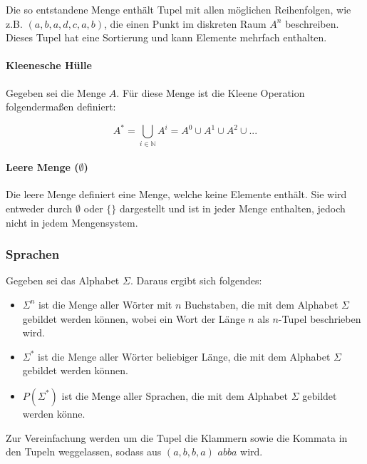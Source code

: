 \documentclass[../main.tex]{subfiles}
\begin{document}
                    Die so entstandene Menge enthält Tupel mit allen möglichen Reihenfolgen, wie z.B. $\left(a, b, a, d, c, a, b\right)$, die einen Punkt im diskreten Raum $A^n$ beschreiben. Dieses Tupel hat eine Sortierung und kann Elemente mehrfach enthalten.
                    
                \paragraph{Kleenesche Hülle}
                    Gegeben sei die Menge $A$. Für diese Menge ist die Kleene Operation folgendermaßen definiert:
                    
                    \begin{equation}
                        A^* = \bigcup_{i \in \mathbb{N} } A^i=A^0\cup A^1\cup A^2\cup ...
                    \end{equation}
                    
    	\paragraph{Leere Menge ($\emptyset$)}
    	    Die leere Menge definiert eine Menge, welche keine Elemente enthält. Sie wird entweder durch $\emptyset$ oder $\{\}$ dargestellt und ist in jeder Menge enthalten, jedoch nicht in jedem Mengensystem.
                
            \subsubsection{Sprachen}
                Gegeben sei das Alphabet $\Sigma$. Daraus ergibt sich folgendes:
                
                \begin{itemize}
                    \item $\Sigma^n$ ist die Menge aller Wörter mit $n$ Buchstaben, die mit dem Alphabet $\Sigma$ gebildet werden können, wobei ein Wort der Länge $n$ als $n$-Tupel beschrieben wird.
                    \item $\Sigma^*$ ist die Menge aller Wörter beliebiger Länge, die mit dem Alphabet $\Sigma$ gebildet werden können.
                    \item $P\left(\Sigma^*\right)$ ist die Menge aller Sprachen, die mit dem Alphabet $\Sigma$ gebildet werden könne.
                \end{itemize}

                Zur Vereinfachung werden um die Tupel die Klammern sowie die Kommata in den Tupeln weggelassen, sodass aus $\left(a, b, b, a\right)$ $abba$ wird.
                    
\end{document}
